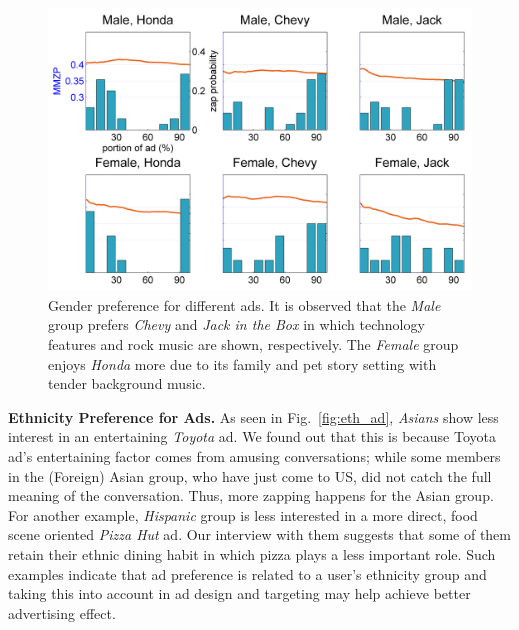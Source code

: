 \documentclass[10pt,journal,cspaper,compsoc]{IEEEtran}
\begin{document}
\begin{figure}[h]
	\centering
		\includegraphics[width=.9\columnwidth]{fig/ad_gend.png}
	\caption{Gender preference for different ads. It is observed that the \textit{Male} group prefers \textit{Chevy} and \textit{Jack in the Box} in which technology features and rock music are shown, respectively. The \textit{Female} group enjoys \textit{Honda} more due to its family and pet story setting with tender background music.}
	\label{fig:ad_gend}
\end{figure}

\noindent \textbf{Ethnicity Preference for Ads.} As seen in Fig.~\ref{fig:eth_ad}, \textit{Asians} show less interest in an entertaining \textit{Toyota} ad. We found out that this is because Toyota ad's entertaining factor comes from amusing conversations; while some members in the (Foreign) Asian group, who have just come to US, did not catch the full meaning of the conversation. Thus, more zapping happens for the Asian group. For another example, \textit{Hispanic} group is less interested in a more direct, food scene oriented \textit{Pizza Hut} ad. Our interview with them suggests that some of them retain their ethnic dining habit in which pizza plays a less important role. Such examples indicate that ad preference is related to a user's ethnicity group and taking this into account in ad design and targeting may help achieve better advertising effect.
\end{document}
